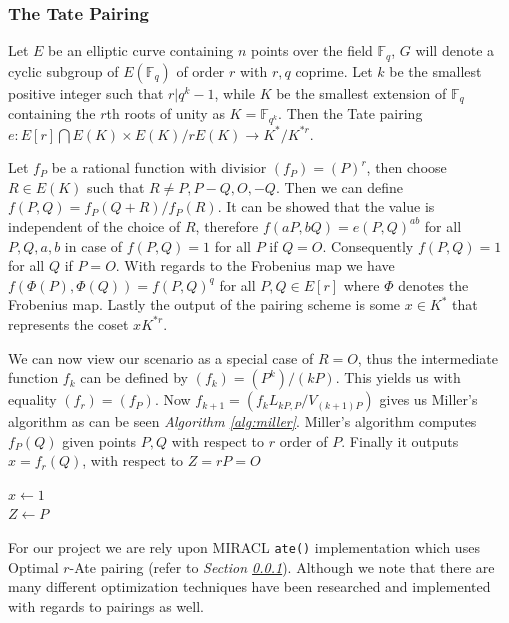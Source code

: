 \subsubsection{The Tate Pairing}

Let $E$ be an elliptic curve containing $n$ points over the field $\mathbb{F}_q$, $G$ will denote a cyclic subgroup of $E(\mathbb{F}_q)$ of order $r$ with $r,q$ coprime. Let $k$ be the smallest positive integer such that $r| q^k -1$, while $K$ be the smallest extension of $\mathbb{F}_q$ containing the $r$th roots of unity as $K= \mathbb{F}_{q^k}$. Then the Tate pairing $e: E[r] \bigcap E(K) \times E(K)/rE(K) \rightarrow K^*/K^{*r}$. \cite{lynn2007implementation}

Let $f_P$ be a rational function with divisior $(f_P)= (P)^r$, then choose $R \in E(K)$ such that $R \neq P, P-Q, O, -Q$. Then we can define $f(P,Q)= f_P(Q+R)/f_P(R)$.
It can be showed that the value is independent of the choice of $R$, therefore $f(aP,bQ) = e(P,Q)^{ab}$ for all $P,Q,a,b$ in case of $f(P,Q)=1$ for all $P$ if $Q=O$. Consequently $f(P,Q) = 1$ for all $Q$ if $P=O$. With regards to the Frobenius map we have $f(\Phi(P), \Phi(Q))=f(P,Q)^q$ for all $P,Q \in E[r]$ where $\Phi$ denotes the Frobenius map. Lastly the output of the pairing scheme is some $x \in K^*$ that represents the coset $xK^{*r}$. \cite{lynn2007implementation}

We can now view our scenario as a special case of $R=O$, thus the intermediate function $f_k$ can be defined by $(f_k)=(P^k)/(kP)$. This yields us with equality $(f_r)=(f_P)$. Now $f_{k+1} = (f_k L_{kP,P}/ V_{(k+1)P})$ gives us Miller's algorithm as can be seen \textit{Algorithm \ref{alg:miller}}. Miller's algorithm computes $f_P(Q)$ given points $P,Q$ with respect to $r$ order of $P$. Finally it outputs $x=f_r(Q)$, with respect to $Z=rP=O$ \cite{lynn2007implementation}

\begin{algorithm}
	\caption{Miller's algorithm for Tate pairing $x=f_P(Q)$}\label{alg:miller}
	$x \gets 1$\\
	$Z \gets P$\\
\end{algorithm}

For our project we are rely upon MIRACL\cite{lib.miracl} \lstinline|ate()| implementation which uses Optimal $r$-Ate pairing  (refer to \textit{Section \ref{}}).  Although we note that there are many different optimization techniques have been researched and implemented with regards to pairings \cite{Aranha2011} as well.

